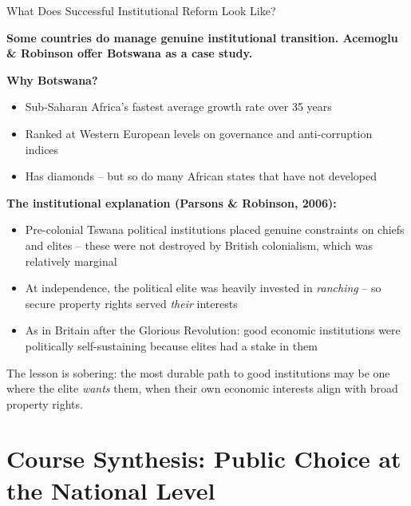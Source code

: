 \documentclass[10pt]{beamer}
\begin{document}
\begin{frame}[allowframebreaks]{What Does Successful Institutional Reform Look Like?}

\textbf{Some countries do manage genuine institutional transition. Acemoglu \& Robinson offer Botswana as a case study.}


\textbf{Why Botswana?}
\begin{itemize}
\item Sub-Saharan Africa's fastest average growth rate over 35 years
\item Ranked at Western European levels on governance and anti-corruption indices
\item Has diamonds -- but so do many African states that have not developed
\end{itemize}


\textbf{The institutional explanation (Parsons \& Robinson, 2006):}
\begin{itemize}
\item Pre-colonial Tswana political institutions placed \alert{genuine constraints} on chiefs and elites -- these were not destroyed by British colonialism, which was relatively marginal
\item At independence, the political elite was heavily invested in \emph{ranching} -- so secure property rights served \emph{their} interests
\item As in Britain after the Glorious Revolution: good economic institutions were politically self-sustaining because elites had a stake in them
\end{itemize}


\alert{The lesson is sobering:} the most durable path to good institutions may be one where the elite \emph{wants} them, when their own economic interests align with broad property rights.
\end{frame}


\section{Course Synthesis: Public Choice at the National Level}
\end{document}

